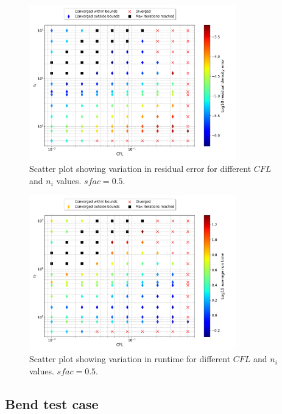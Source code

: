 \documentclass{article}
\begin{document}
\begin{figure}[H]
    \centering
    \includegraphics[width=0.8\textwidth]{figures/bump_ni_cfl_residual.png}
    \caption{Scatter plot showing variation in residual error for different $CFL$ and $n_i$ values. $sfac = 0.5$.}
    \label{fig:bump_ni_cfl_residual}
\end{figure}

\begin{figure}[H]
    \centering
    \centering
    \includegraphics[width=0.8\textwidth]{figures/bump_ni_cfl_time.png}
    \caption{Scatter plot showing variation in runtime for different $CFL$ and $n_i$ values. $sfac = 0.5$.}
    \label{fig:bump_ni_cfl_time}
\end{figure}

\subsection{Bend test case}
\end{document}
